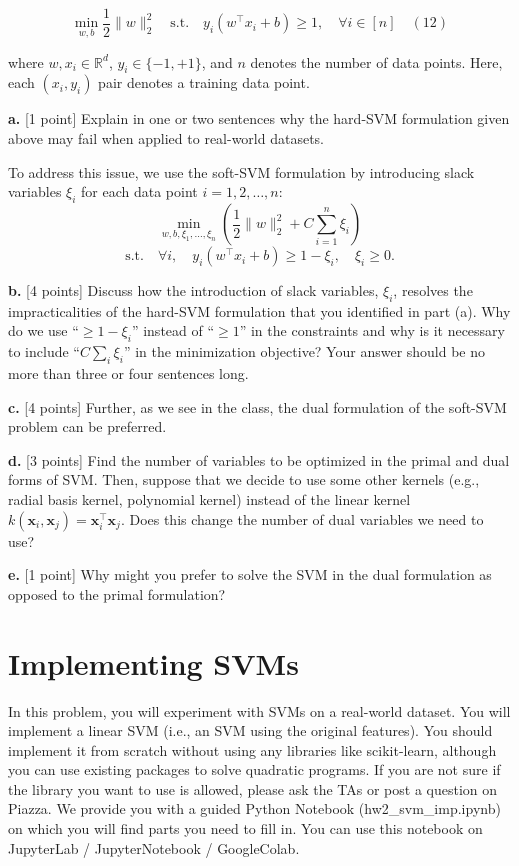 \documentclass[a3paper,12pt]{extarticle} %
\begin{document}
\[
\min_{w, b} \frac{1}{2} \|w\|_2^2 \quad \text{s.t.} \quad y_i(w^\top x_i + b) \geq 1, \quad \forall i \in [n] \quad (12)
\]

where \( w, x_i \in \mathbb{R}^d \), \( y_i \in \{-1, +1\} \), and \( n \) denotes the number of data points. Here, each \( (x_i, y_i) \) pair denotes a training data point.

\noindent \textbf{a.} [1 point] Explain in one or two sentences why the hard-SVM formulation given above may fail when applied to real-world datasets.

To address this issue, we use the soft-SVM formulation by introducing slack variables $\xi_i$ for each data point $i = 1, 2, \ldots, n$:
\[
\min_{w, b, \xi_1, \ldots, \xi_n} \left( \frac{1}{2} \|w\|_2^2 + C \sum_{i=1}^n \xi_i \right)
\]
\[
\text{s.t.} \quad \forall i, \quad y_i(w^\top x_i + b) \geq 1 - \xi_i, \quad \xi_i \geq 0.
\]

\noindent \textbf{b.} [4 points] Discuss how the introduction of slack variables, $\xi_i$, resolves the impracticalities of the hard-SVM formulation that you identified in part (a). Why do we use “$\geq 1 - \xi_i$” instead of “$\geq 1$” in the constraints and why is it necessary to include “$C \sum_i \xi_i$” in the minimization objective? Your answer should be no more than three or four sentences long.

\noindent \textbf{c.} [4 points] Further, as we see in the class, the dual formulation of the soft-SVM problem can be preferred.

\noindent \textbf{d.} [3 points] Find the number of variables to be optimized in the primal and dual forms of SVM. Then, suppose that we decide to use some other kernels (e.g., radial basis kernel, polynomial kernel) instead of the linear kernel \( k(\mathbf{x}_i, \mathbf{x}_j) = \mathbf{x}_i^\top \mathbf{x}_j \). Does this change the number of dual variables we need to use?

\noindent \textbf{e.} [1 point] Why might you prefer to solve the SVM in the dual formulation as opposed to the primal formulation?

\newpage
\section {Implementing SVMs}

In this problem, you will experiment with SVMs on a real-world dataset. You will implement a linear SVM (i.e., an SVM using the original features). You should implement it from scratch without using any libraries like scikit-learn, although you can use existing packages to solve quadratic programs. If you are not sure if the library you want to use is allowed, please ask the TAs or post a question on Piazza. We provide you with a guided Python Notebook (hw2\_svm\_imp.ipynb) on which you will find parts you need to fill in. You can use this notebook on JupyterLab / JupyterNotebook / GoogleColab.
\end{document}
